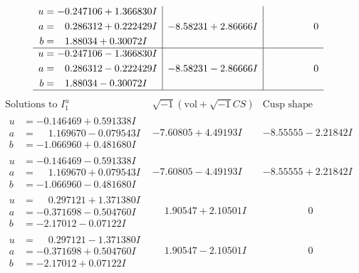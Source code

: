 \documentclass[1p]{elsarticle_modified}
\theoremstyle{definition}
\newcommand{\I}{\sqrt{-1}}
\begin{document}
$$\begin{array}{c|c|c}
\begin{aligned}
u &= -0.247106 + 1.366830 I \\
a &= \phantom{-}0.286312 + 0.222429 I \\
b &= \phantom{-}1.88034 + 0.30072 I\end{aligned}
 & -8.58231 + 2.86666 I & \phantom{-0.000000 } 0 \\ \hline\begin{aligned}
u &= -0.247106 - 1.366830 I \\
a &= \phantom{-}0.286312 - 0.222429 I \\
b &= \phantom{-}1.88034 - 0.30072 I\end{aligned}
 & -8.58231 - 2.86666 I & \phantom{-0.000000 } 0\\
 \hline 
 \end{array}$$\newpage$$\begin{array}{c|c|c}  
\text{Solutions to }I^u_{1}& \I (\text{vol} + \sqrt{-1}CS) & \text{Cusp shape}\\
 \hline 
\begin{aligned}
u &= -0.146469 + 0.591338 I \\
a &= \phantom{-}1.169670 - 0.079543 I \\
b &= -1.066960 + 0.481680 I\end{aligned}
 & -7.60805 + 4.49193 I & -8.55555 - 2.21842 I \\ \hline\begin{aligned}
u &= -0.146469 - 0.591338 I \\
a &= \phantom{-}1.169670 + 0.079543 I \\
b &= -1.066960 - 0.481680 I\end{aligned}
 & -7.60805 - 4.49193 I & -8.55555 + 2.21842 I \\ \hline\begin{aligned}
u &= \phantom{-}0.297121 + 1.371380 I \\
a &= -0.371698 - 0.504760 I \\
b &= -2.17012 - 0.07122 I\end{aligned}
 & \phantom{-}1.90547 + 2.10501 I & \phantom{-0.000000 } 0 \\ \hline\begin{aligned}
u &= \phantom{-}0.297121 - 1.371380 I \\
a &= -0.371698 + 0.504760 I \\
b &= -2.17012 + 0.07122 I\end{aligned}
 & \phantom{-}1.90547 - 2.10501 I & \phantom{-0.000000 } 0 \\ \hline\begin{aligned}

\end{aligned}
\end{array}$$
\end{document}
